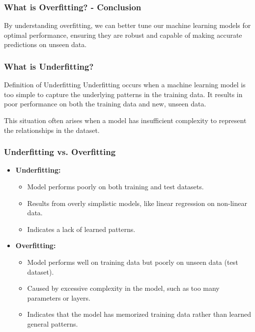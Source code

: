 \documentclass[aspectratio=169]{beamer}
\begin{document}
\begin{frame}[fragile]
    \frametitle{What is Overfitting? - Conclusion}
    By understanding overfitting, we can better tune our machine learning models for optimal performance, ensuring they are robust and capable of making accurate predictions on unseen data.
\end{frame}

\begin{frame}[fragile]
    \frametitle{What is Underfitting?}
    
    \begin{block}{Definition of Underfitting}
        Underfitting occurs when a machine learning model is too simple to capture the underlying patterns in the training data. It results in poor performance on both the training data and new, unseen data.
    \end{block}
    
    This situation often arises when a model has insufficient complexity to represent the relationships in the dataset.
\end{frame}

\begin{frame}[fragile]
    \frametitle{Underfitting vs. Overfitting}
    
    \begin{itemize}
        \item \textbf{Underfitting:}
        \begin{itemize}
            \item Model performs poorly on both training and test datasets.
            \item Results from overly simplistic models, like linear regression on non-linear data.
            \item Indicates a lack of learned patterns.
        \end{itemize}
        
        \item \textbf{Overfitting:}
        \begin{itemize}
            \item Model performs well on training data but poorly on unseen data (test dataset).
            \item Caused by excessive complexity in the model, such as too many parameters or layers.
            \item Indicates that the model has memorized training data rather than learned general patterns.
        \end{itemize}
    \end{itemize}
\end{frame}
\end{document}
